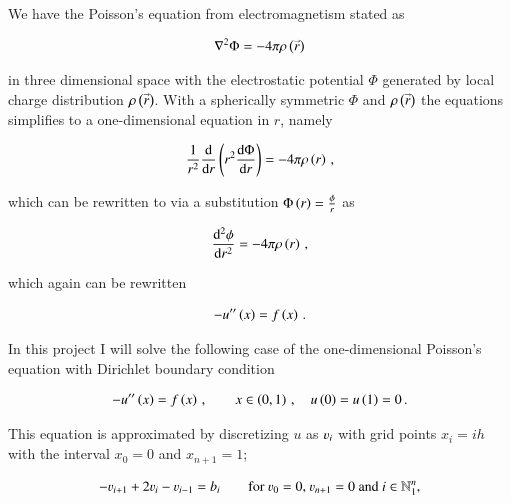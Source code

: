 \documentclass[11pt,english,a4paper]{article}
\begin{document}
\maketitle
\begin{flushleft}

\begin{abstract}

\end{abstract}

We have the Poisson's equation from electromagnetism stated as

\begin{align*}
\nabla^2 \Phi = - 4 \pi \rho\left({\accentset{\rightarrow}{r}}\right)
\end{align*}

in three dimensional space with the electrostatic potential $\Phi$ generated by local charge distribution $\rho\left({\accentset{\rightarrow}{r}}\right)$. With a spherically symmetric $\Phi$ and $\rho\left({\accentset{\rightarrow}{r}}\right)$ the equations simplifies to a one-dimensional equation in $r$, namely

\begin{align*}
\frac{1}{r^2}\frac{\mathrm{d}}{\mathrm{d}r}\left({r^2\frac{\mathrm{d}\Phi}{\mathrm{d}r}}\right) = -4 \pi \rho\left({r}\right) \,,
\end{align*}

which can be rewritten to via a substitution $\Phi\left({r}\right) = \frac{\phi}{r}$ as 

\begin{align*}
\frac{\mathrm{d}^2\phi}{\mathrm{d}r^2} = - 4\pi \rho\left({r}\right) \,,
\end{align*}

which again can be rewritten 

\begin{align*}
-u^{\prime\prime}\left({x}\right) = f\left({x}\right) \,.
\end{align*}

In this project I will solve the following case of the one-dimensional Poisson's equation with Dirichlet boundary condition

\begin{align}
-u^{\prime\prime}\left({x}\right) = f\left({x}\right)\,,  \qquad x\in\left({0,1}\right)\,,\quad u\left({0}\right) = u\left({1}\right) = 0 \,.
\label{eq_1}
\end{align}

This equation is approximated by discretizing $u$ as $\varv_i$ with grid points $x_i = i h$ with the interval $x_0 = 0$ and $x_{n+1}=1$;

\begin{align}
-\varv_{i+1} + 2 \varv_i - \varv_{i-1} = b_i \qquad \text{for $\varv_0 = 0$, $\varv_{n+1} = 0$ and $i\in\mathbb{N}_1^n$,}
\label{eq_2}
\end{align}


\end{flushleft}
\end{document}
